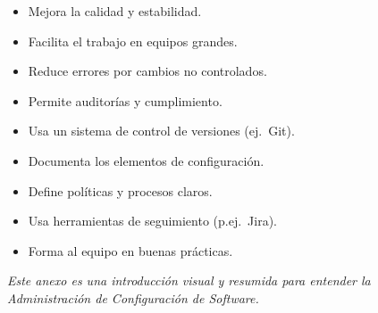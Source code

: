 \documentclass[a4paper,11pt]{report}
\begin{document}
\begin{multicols}{2}
        \begin{cajarosa}[Beneficios]
            \begin{itemize}[leftmargin=*]
                \item Mejora la calidad y estabilidad.
                \item Facilita el trabajo en equipos grandes.
                \item Reduce errores por cambios no controlados.
                \item Permite auditorías y cumplimiento.
            \end{itemize}
        \end{cajarosa}

        \vspace{0.5em}

        \begin{cajaroja}
            \begin{itemize}[leftmargin=*]
                \item Usa un sistema de control de versiones (ej.\ Git).
                \item Documenta los elementos de configuración.
                \item Define políticas y procesos claros.
                \item Usa herramientas de seguimiento (p.ej.\ Jira).
                \item Forma al equipo en buenas prácticas.
            \end{itemize}
        \end{cajaroja}

    \end{multicols}

    \vspace{1em}
    \begin{center}
        \small\textit{Este anexo es una introducción visual y resumida para entender la Administración de Configuración de Software.}
    \end{center}
\end{document}

